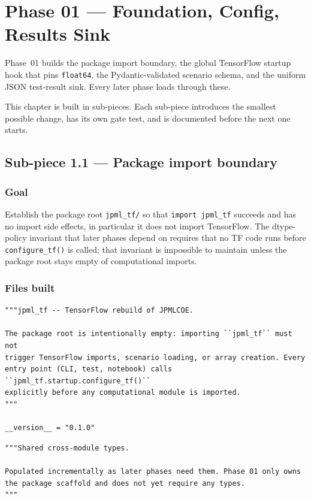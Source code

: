 \documentclass[11pt]{report}
\begin{document}
\chapter{Phase 01 --- Foundation, Config, Results Sink}

Phase~01 builds the package import boundary, the global TensorFlow
startup hook that pins \texttt{float64}, the Pydantic-validated scenario
schema, and the uniform JSON test-result sink. Every later phase loads
through these.

This chapter is built in sub-pieces. Each sub-piece introduces the
smallest possible change, has its own gate test, and is documented
before the next one starts.

\section{Sub-piece 1.1 --- Package import boundary}

\subsection*{Goal}

Establish the package root \texttt{jpml\_tf/} so that
\texttt{import jpml\_tf} succeeds and has no import side effects, in
particular it does not import TensorFlow. The dtype-policy invariant
that later phases depend on requires that no TF code runs before
\texttt{configure\_tf()} is called; that invariant is impossible to
maintain unless the package root stays empty of computational imports.

\subsection*{Files built}

\begin{lstlisting}[style=python, caption={\texttt{code\_clean/jpml\_tf/\_\_init\_\_.py}}]
"""jpml_tf -- TensorFlow rebuild of JPMLCOE.

The package root is intentionally empty: importing ``jpml_tf`` must not
trigger TensorFlow imports, scenario loading, or array creation. Every
entry point (CLI, test, notebook) calls ``jpml_tf.startup.configure_tf()``
explicitly before any computational module is imported.
"""

__version__ = "0.1.0"
\end{lstlisting}

\begin{lstlisting}[style=python, caption={\texttt{code\_clean/jpml\_tf/types.py}}]
"""Shared cross-module types.

Populated incrementally as later phases need them. Phase 01 only owns
the package scaffold and does not yet require any types.
"""
\end{lstlisting}
\end{document}
